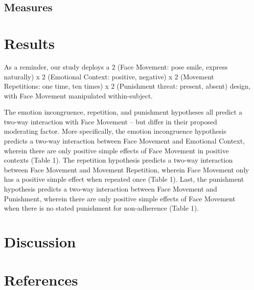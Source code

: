\documentclass[
  letterpaper,
  DIV=11,
  numbers=noendperiod]{scrartcl}
\begin{document}
\subsection{Measures}\label{measures}

\section{Results}\label{results}

As a reminder, our study deploys a 2 (Face Movement: pose smile, express
naturally) x 2 (Emotional Context: positive, negative) x 2 (Movement
Repetitions: one time, ten times) x 2 (Punishment threat: present,
absent) design, with Face Movement manipulated within-subject.

The emotion incongruence, repetition, and punishment hypotheses all
predict a two-way interaction with Face Movement -- but differ in their
proposed moderating factor. More specifically, the emotion incongruence
hypothesis predicts a two-way interaction between Face Movement and
Emotional Context, wherein there are only positive simple effects of
Face Movement in positive contexts (Table 1). The repetition hypothesis
predicts a two-way interaction between Face Movement and Movement
Repetition, wherein Face Movement only has a positive simple effect when
repeated once (Table 1). Last, the punishment hypothesis predicts a
two-way interaction between Face Movement and Punishment, wherein there
are only positive simple effects of Face Movement when there is no
stated punishment for non-adherence (Table 1).

\section{Discussion}\label{discussion}

\section*{References}\label{references}
\end{document}
